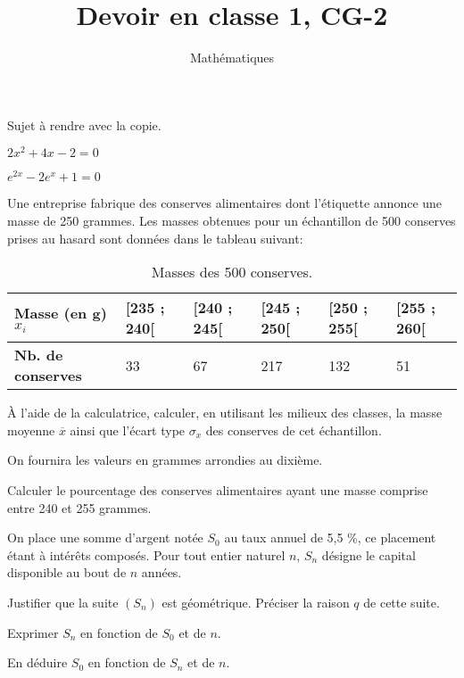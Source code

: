 \documentclass[a4paper,12pt]{scrartcl}
\date{}
\title{Devoir en classe 1, CG-2}
\author{Mathématiques}
\begin{document}
\maketitle

Sujet à rendre avec la copie.


\question{}
$2x^2 +4x - 2 = 0$

\question{}
$e^{2x} - 2e^x + 1 = 0$


Une entreprise fabrique des conserves alimentaires dont l'étiquette annonce une masse de 250 grammes.
Les masses obtenues pour un échantillon de 500 conserves prises au hasard sont données dans le tableau suivant: 

\begin{table}[h]
\centering
\caption{Masses des 500 conserves.}
\label{table_conserves}
\begin{tabular}{|l|l|l|l|l|l|}
\hline
\textbf{Masse (en g) $x_{i}$}        & {[}235 ; 240{[} & {[}240 ; 245{[} & {[}245 ; 250{[} & {[}250 ; 255{[} & {[}255 ; 260{[} \\ \hline
\textbf{Nb. de conserves} & 33              & 67              & 217             & 132             & 51              \\ \hline
\end{tabular}
\end{table}

\question{}
À l'aide de la calculatrice, calculer, en utilisant les milieux des classes, la masse moyenne $\overline{x}$ ainsi que l'écart type $\sigma_x$ des conserves de cet échantillon.

On fournira les valeurs en grammes arrondies au dixième.

\question{}
Calculer le pourcentage des conserves alimentaires ayant une masse comprise entre 240 et 255 grammes. 


On place une somme d'argent notée $S_0$ au taux annuel de 5,5 \%, ce placement étant à intérêts composés.
Pour tout entier naturel $n$, $S_n$ désigne le capital disponible au bout de $n$ années.

\question{}
Justifier que la suite $(S_n)$ est géométrique. Préciser la raison $q$ de cette suite.

\question{}
Exprimer $S_n$ en fonction de $S_0$ et de $n$.

\question{}
En déduire $S_0$ en fonction de $S_n$ et de $n$.
\end{document}
